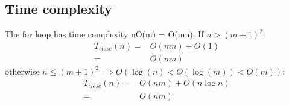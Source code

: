 \documentclass{article}
\begin{document}
\subsection{Time complexity}
The for loop has time complexity nO(m) = O(mn). If $n > (m + 1)^2$:
\begin{align*}
T_{close}(n)
=& O(mn) + O(1)\\
=& O(mn)
\end{align*}
otherwise $n \leq (m + 1)^2 \implies O(\log(n) < O(\log(m)) < O(m))$:
\begin{align*}
T_{close}(n)
=& O(nm) + O(n \log n) \\
=& O(nm)
\end{align*}
\end{document}
